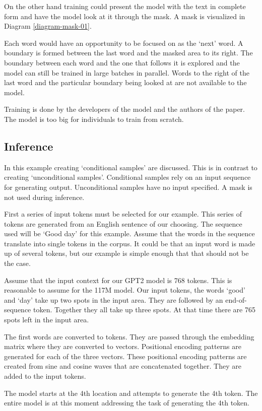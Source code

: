 On the other hand training could present the model with the text in complete form and have the model look at it through the mask. A mask is visualized in Diagram \ref{diagram-mask-01}.

Each word would have an opportunity to be focused on as the `next' word. A boundary is formed between the last word and the masked area to its right. The boundary between each word and the one that follows it is explored and the model can still be trained in large batches in parallel. Words to the right of the last word and the particular boundary being looked at are not available to the model.

Training is done by the developers of the model and the authors of the paper. The model is too big for individuals to train from scratch. 

\subsection{Inference}

In this example creating `conditional samples' are discussed. This is in contrast to creating `unconditional samples'. Conditional samples rely on an input sequence for generating output. Unconditional samples have no input specified. A mask is not used during inference.

First a series of input tokens must be selected for our example. This series of tokens are generated from an English sentence of our choosing. The sequence used will be `Good day' for this example. Assume that the words in the sequence translate into single tokens in the corpus. It could be that an input word is made up of several tokens, but our example is simple enough that that should not be the case.

Assume that the input context for our GPT2 model is 768 tokens. This is reasonable to assume for the 117M model. Our input tokens, the words `good' and `day' take up two spots in the input area. They are followed by an end-of-sequence token. Together they all take up three spots. At that time there are 765 spots left in the input area.

The first words are converted to tokens. They are passed through the embedding matrix where they are converted to vectors. Positional encoding patterns are generated for each of the three vectors. These positional encoding patterns are created from sine and cosine waves that are concatenated together. They are added to the input tokens.

The model starts at the 4th location and attempts to generate the 4th token. The entire model is at this moment addressing the task of generating the 4th token.

